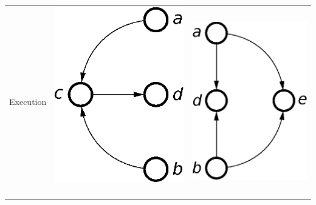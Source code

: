 \begin{table}
\begin{centering}
\begin{tabular}{|c||c||c|c|}
\multicolumn{2}{|c||}{Execution} & \includegraphics[bb=-10bp 90bp 158bp 220bp,scale=0.4]{fig/projection_1}~~~ & \includegraphics[bb=-20bp 90bp 157bp 220bp,scale=0.4]{fig/projection_2}\tabularnewline

\end{tabular}
\end{centering}
\end{table}
